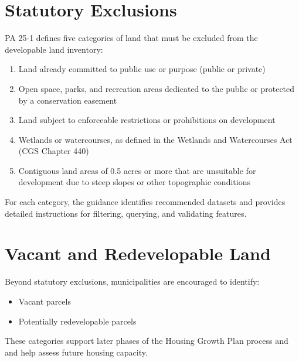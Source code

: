 \documentclass[
  letterpaper,
  DIV=11,
  numbers=noendperiod]{scrreprt}
\providecommand{\tightlist}{%
  \setlength{\itemsep}{0pt}\setlength{\parskip}{0pt}}
\begin{document}
\section*{Statutory Exclusions}\label{statutory-exclusions}


PA 25‑1 defines five categories of land that must be excluded from the
developable land inventory:

\begin{enumerate}
\def\labelenumi{\Alph{enumi}.}
\tightlist
\item
  Land already committed to public use or purpose (public or private)
\item
  Open space, parks, and recreation areas dedicated to the public or
  protected by a conservation easement
\item
  Land subject to enforceable restrictions or prohibitions on
  development
\item
  Wetlands or watercourses, as defined in the Wetlands and Watercourses
  Act (CGS Chapter 440)
\item
  Contiguous land areas of 0.5 acres or more that are unsuitable for
  development due to steep slopes or other topographic conditions
\end{enumerate}

For each category, the guidance identifies recommended datasets and
provides detailed instructions for filtering, querying, and validating
features.

\section*{Vacant and Redevelopable
Land}\label{vacant-and-redevelopable-land}


Beyond statutory exclusions, municipalities are encouraged to identify:

\begin{itemize}
\item
  Vacant parcels
\item
  Potentially redevelopable parcels
\end{itemize}

These categories support later phases of the Housing Growth Plan process
and and help assess future housing capacity.
\end{document}
